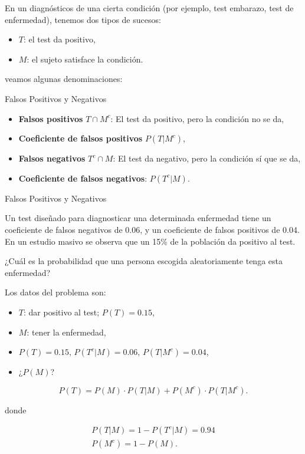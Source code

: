 \documentclass[
  letterpaper,
  DIV=11,
  numbers=noendperiod]{scrreprt}
\providecommand{\tightlist}{%
  \setlength{\itemsep}{0pt}\setlength{\parskip}{0pt}}\usepackage{longtable,booktabs,array}
\begin{document}
En un diagnósticos de una cierta condición (por ejemplo, test embarazo,
test de enfermedad), tenemos dos tipos de sucesos:

\begin{itemize}
\tightlist
\item
  \(T\): el test da positivo,
\item
  \(M\): el sujeto satisface la condición.
\end{itemize}

veamos algunas denominaciones:

Falsos Positivos y Negativos

\begin{itemize}
\tightlist
\item
  \textbf{Falsos positivos} \(T\cap M^c\): El test da positivo, pero la
  condición no se da,
\item
  \textbf{Coeficiente de falsos positivos} \(P(T|M^c)\),
\item
  \textbf{Falsos negativos} \(T^c\cap M\): El test da negativo, pero la
  condición sí que se da,
\item
  \textbf{Coeficiente de falsos negativos}: \(P(T^c|M)\).
\end{itemize}

Falsos Positivos y Negativos

Un test diseñado para diagnosticar una determinada enfermedad tiene un
coeficiente de falsos negativos de 0.06, y un coeficiente de falsos
positivos de 0.04. En un estudio masivo se observa que un 15\% de la
población da positivo al test.

¿Cuál es la probabilidad que una persona escogida aleatoriamente tenga
esta enfermedad?

Los datos del problema son:

\begin{itemize}
\tightlist
\item
  \(T\): dar positivo al test; \(P(T)=0.15\),
\item
  \(M\): tener la enfermedad,
\item
  \(P(T)=0.15\), \(P(T^c|M)=0.06\), \(P(T|M^c)=0.04\),
\item
  ¿\(P(M)\)?
\end{itemize}

\[
P(T) =P(M)\cdot P(T|M)+P(M^c)\cdot P(T|M^c).
\]

donde

\[
\begin{array}{l}
P(T|M)=1-P(T^c|M)=0.94 \\
P(M^c)=1-P(M).
\end{array}
\]
\end{document}
